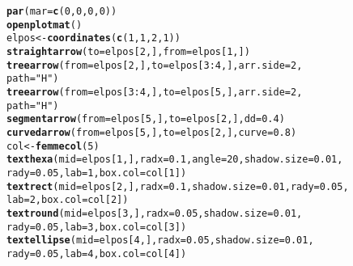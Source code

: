 \documentclass{article}\usepackage[]{graphicx}\usepackage[]{xcolor}
\makeatletter
\newcommand{\hlnum}[1]{\textcolor[rgb]{0.686,0.059,0.569}{#1}}%
\newcommand{\hlsng}[1]{\textcolor[rgb]{0.192,0.494,0.8}{#1}}%
\newcommand{\hlopt}[1]{\textcolor[rgb]{0,0,0}{#1}}%
\newcommand{\hldef}[1]{\textcolor[rgb]{0.345,0.345,0.345}{#1}}%
\newcommand{\hlkwb}[1]{\textcolor[rgb]{0.69,0.353,0.396}{#1}}%
\newcommand{\hlkwc}[1]{\textcolor[rgb]{0.333,0.667,0.333}{#1}}%
\newcommand{\hlkwd}[1]{\textcolor[rgb]{0.737,0.353,0.396}{\textbf{#1}}}%
\newenvironment{kframe}{%
 \def\at@end@of@kframe{}%
 \ifinner\ifhmode%
  \def\at@end@of@kframe{\end{minipage}}%
  \begin{minipage}{\columnwidth}%
 \fi\fi%
 \def\FrameCommand##1{\hskip\@totalleftmargin \hskip-\fboxsep
 \colorbox{shadecolor}{##1}\hskip-\fboxsep
     \hskip-\linewidth \hskip-\@totalleftmargin \hskip\columnwidth}%
 \MakeFramed {\advance\hsize-\width
   \@totalleftmargin\z@ \linewidth\hsize
   \@setminipage}}%
 {\par\unskip\endMakeFramed%
 \at@end@of@kframe}
\newenvironment{knitrout}{}{} %
\makeatother
\begin{document}
\begin{knitrout}
\begin{kframe}
\begin{alltt}
\hlkwd{par}\hldef{(}\hlkwc{mar} \hldef{=} \hlkwd{c}\hldef{(}\hlnum{0}\hldef{,} \hlnum{0}\hldef{,} \hlnum{0}\hldef{,} \hlnum{0}\hldef{))}
\hlkwd{openplotmat}\hldef{()}
\hldef{elpos} \hlkwb{<-} \hlkwd{coordinates}\hldef{(}\hlkwd{c}\hldef{(}\hlnum{1}\hldef{,} \hlnum{1}\hldef{,} \hlnum{2}\hldef{,} \hlnum{1}\hldef{))}
\hlkwd{straightarrow}\hldef{(}\hlkwc{to} \hldef{= elpos[}\hlnum{2}\hldef{, ],} \hlkwc{from} \hldef{= elpos[}\hlnum{1}\hldef{, ])}
\hlkwd{treearrow}\hldef{(}\hlkwc{from} \hldef{= elpos[}\hlnum{2}\hldef{, ],} \hlkwc{to} \hldef{= elpos[}\hlnum{3}\hlopt{:}\hlnum{4}\hldef{, ],} \hlkwc{arr.side} \hldef{=} \hlnum{2}\hldef{,}
    \hlkwc{path} \hldef{=} \hlsng{"H"}\hldef{)}
\hlkwd{treearrow}\hldef{(}\hlkwc{from} \hldef{= elpos[}\hlnum{3}\hlopt{:}\hlnum{4}\hldef{, ],} \hlkwc{to} \hldef{= elpos[}\hlnum{5}\hldef{, ],} \hlkwc{arr.side} \hldef{=} \hlnum{2}\hldef{,}
    \hlkwc{path} \hldef{=} \hlsng{"H"}\hldef{)}
\hlkwd{segmentarrow}\hldef{(}\hlkwc{from} \hldef{= elpos[}\hlnum{5}\hldef{, ],} \hlkwc{to} \hldef{= elpos[}\hlnum{2}\hldef{, ],} \hlkwc{dd} \hldef{=} \hlnum{0.4}\hldef{)}
\hlkwd{curvedarrow}\hldef{(}\hlkwc{from} \hldef{= elpos[}\hlnum{5}\hldef{, ],} \hlkwc{to} \hldef{= elpos[}\hlnum{2}\hldef{, ],} \hlkwc{curve} \hldef{=} \hlnum{0.8}\hldef{)}
\hldef{col} \hlkwb{<-} \hlkwd{femmecol}\hldef{(}\hlnum{5}\hldef{)}
\hlkwd{texthexa}\hldef{(}\hlkwc{mid} \hldef{= elpos[}\hlnum{1}\hldef{, ],} \hlkwc{radx} \hldef{=} \hlnum{0.1}\hldef{,} \hlkwc{angle} \hldef{=} \hlnum{20}\hldef{,} \hlkwc{shadow.size} \hldef{=} \hlnum{0.01}\hldef{,}
    \hlkwc{rady} \hldef{=} \hlnum{0.05}\hldef{,} \hlkwc{lab} \hldef{=} \hlnum{1}\hldef{,} \hlkwc{box.col} \hldef{= col[}\hlnum{1}\hldef{])}
\hlkwd{textrect}\hldef{(}\hlkwc{mid} \hldef{= elpos[}\hlnum{2}\hldef{, ],} \hlkwc{radx} \hldef{=} \hlnum{0.1}\hldef{,} \hlkwc{shadow.size} \hldef{=} \hlnum{0.01}\hldef{,} \hlkwc{rady} \hldef{=} \hlnum{0.05}\hldef{,}
    \hlkwc{lab} \hldef{=} \hlnum{2}\hldef{,} \hlkwc{box.col} \hldef{= col[}\hlnum{2}\hldef{])}
\hlkwd{textround}\hldef{(}\hlkwc{mid} \hldef{= elpos[}\hlnum{3}\hldef{, ],} \hlkwc{radx} \hldef{=} \hlnum{0.05}\hldef{,} \hlkwc{shadow.size} \hldef{=} \hlnum{0.01}\hldef{,}
    \hlkwc{rady} \hldef{=} \hlnum{0.05}\hldef{,} \hlkwc{lab} \hldef{=} \hlnum{3}\hldef{,} \hlkwc{box.col} \hldef{= col[}\hlnum{3}\hldef{])}
\hlkwd{textellipse}\hldef{(}\hlkwc{mid} \hldef{= elpos[}\hlnum{4}\hldef{, ],} \hlkwc{radx} \hldef{=} \hlnum{0.05}\hldef{,} \hlkwc{shadow.size} \hldef{=} \hlnum{0.01}\hldef{,}
    \hlkwc{rady} \hldef{=} \hlnum{0.05}\hldef{,} \hlkwc{lab} \hldef{=} \hlnum{4}\hldef{,} \hlkwc{box.col} \hldef{= col[}\hlnum{4}\hldef{])}

\end{alltt}
\end{kframe}
\end{knitrout}
\end{document}
